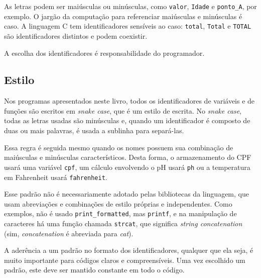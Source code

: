 \documentclass[
  11pt,
  a4paper,
]{scrbook}
\begin{document}
As letras podem ser maiúsculas ou minúsculas, como \texttt{valor},
\texttt{Idade} e \texttt{ponto\_A}, por exemplo. O jargão da computação
para referenciar maiúsculas e minúsculas é caso. A linguagem C tem
identificadores sensíveis ao caso: \texttt{total}, \texttt{Total} e
\texttt{TOTAL} são identificadores distintos e podem coexistir.

A escolha dos identificadores é responsabilidade do programador.

\subsection{Estilo}\label{estilo}

Nos programas apresentados neste livro, todos os identificadores de
variáveis e de funções são escritos em \emph{snake case}, que é um
estilo de escrita. No \emph{snake case}, todas as letras usadas são
minúsculas e, quando um identificador é composto de duas ou mais
palavras, é usada a sublinha para separá-las.

Essa regra é seguida mesmo quando os nomes possuem sua combinação de
maiúsculas e minúsculas característicos. Desta forma, o armazenamento do
CPF usará uma variável \texttt{cpf}, um cálculo envolvendo o pH usará
\texttt{ph} ou a temperatura em Fahrenheit usará \texttt{fahrenheit}.

Esse padrão não é necessariamente adotado pelas bibliotecas da
linguagem, que usam abreviações e combinações de estilo próprias e
independentes. Como exemplos, não é usado \texttt{print\_formatted}, mas
\texttt{printf}, e na manipulação de caracteres há uma função chamada
\texttt{strcat}, que significa \emph{string concatenation} (sim,
\emph{concatenation} é abreviada para \emph{cat}).

\begin{tcolorbox}[enhanced jigsaw, arc=.35mm, bottomtitle=1mm, colbacktitle=quarto-callout-tip-color!10!white, title=\textcolor{quarto-callout-tip-color}{\faLightbulb}\hspace{0.5em}{Dica}, toprule=.15mm, left=2mm, opacityback=0, colback=white, colframe=quarto-callout-tip-color-frame, opacitybacktitle=0.6, bottomrule=.15mm, leftrule=.75mm, toptitle=1mm, coltitle=black, titlerule=0mm, rightrule=.15mm, breakable]

A aderência a um padrão no formato dos identificadores, qualquer que ela
seja, é muito importante para códigos claros e compreensíveis. Uma vez
escolhido um padrão, este deve ser mantido constante em todo o código.

\end{tcolorbox}
\end{document}
